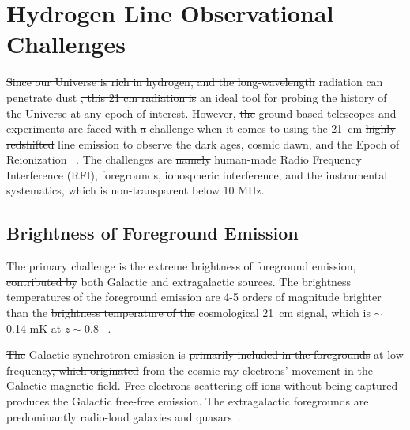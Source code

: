 	    \section{Hydrogen Line Observational Challenges}
	    
	    \st{Since our Universe is rich in hydrogen, and the long-wavelength}  radiation can penetrate dust  \st{, this 21 cm radiation is}  an ideal tool for probing the history of the Universe at any epoch of interest. However, \st{the} ground-based telescopes and experiments are faced with \st{a}  challenge when it comes to using the  \SI{21}{cm} \st{highly redshifted} line emission to observe the dark ages, cosmic dawn, and the Epoch of Reionization ~\citep{2016ExA....41..271R}. The  challenges are \st{namely} human-made Radio Frequency Interference  (RFI),  foregrounds, ionospheric interference, and \st{the} instrumental systematics\st{, which is non-transparent below 10 MHz}. 
	    
	    \subsection*{Brightness of Foreground Emission}
	    
	    \st{The primary challenge is the extreme brightness of f}oreground emission\st{, contributed by}  both Galactic and extragalactic sources.
	    The brightness temperatures of the foreground emission are 4-5 orders of magnitude brighter than  the \st{brightness temperature of the} cosmological \SI{21}{cm} signal, which is $\sim$ 0.14 mK at $z\sim0.8$ ~\citep{2018RAA....18..114H}. 
	    
	    \st{The} Galactic synchrotron emission is \st{primarily included in the foregrounds}  at low frequency\st{, which originated}  from the cosmic ray electrons' movement in the Galactic magnetic field. Free electrons scattering off ions without being captured produces the Galactic free-free emission. The extragalactic foregrounds are predominantly radio-loud galaxies and quasars~\citep{2018RAA....18..114H, 2008MNRAS.389.1319J}.
	    
